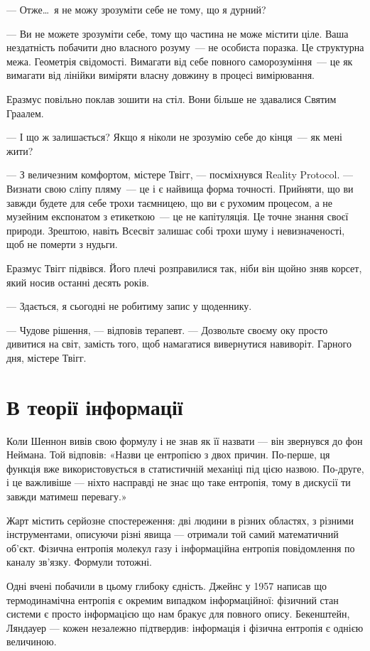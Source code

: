 \documentclass[12pt, a4paper, openany]{book}
\begin{document}
\begin{realitybox}
--- Отже\ldots\ я не можу зрозуміти себе не тому, що я дурний?

--- Ви не можете зрозуміти себе, тому що частина не може містити ціле. Ваша нездатність побачити дно власного розуму~--- не особиста поразка. Це структурна межа. Геометрія свідомості. Вимагати від себе повного саморозуміння~--- це як вимагати від лінійки виміряти власну довжину в процесі вимірювання.

\medskip
Еразмус повільно поклав зошити на стіл. Вони більше не здавалися Святим Граалем.

--- І що ж залишається? Якщо я ніколи не зрозумію себе до кінця~--- як мені жити?

--- З величезним комфортом, містере Твігг, --- посміхнувся Reality Protocol. --- Визнати свою сліпу пляму~--- це і є найвища форма точності. Прийняти, що ви завжди будете для себе трохи таємницею, що ви є рухомим процесом, а не музейним експонатом з етикеткою~--- це не капітуляція. Це точне знання своєї природи. Зрештою, навіть Всесвіт залишає собі трохи шуму і невизначеності, щоб не померти з нудьги.

\medskip
Еразмус Твігг підвівся. Його плечі розправилися так, ніби він щойно зняв корсет, який носив останні десять років.

--- Здається, я сьогодні не робитиму запис у щоденнику.

--- Чудове рішення, --- відповів терапевт. --- Дозвольте своєму оку просто дивитися на світ, замість того, щоб намагатися вивернутися навиворіт. Гарного дня, містере Твігг.
\end{realitybox}

\chapter{В теорії інформації}

Коли Шеннон вивів свою формулу і не знав як її назвати --- він звернувся до фон Неймана. Той відповів: «Назви це ентропією з двох причин. По-перше, ця функція вже використовується в статистичній механіці під цією назвою. По-друге, і це важливіше --- ніхто насправді не знає що таке ентропія, тому в дискусії ти завжди матимеш перевагу.»

Жарт містить серйозне спостереження: дві людини в різних областях, з різними інструментами, описуючи різні явища --- отримали той самий математичний об'єкт. Фізична ентропія молекул газу і інформаційна ентропія повідомлення по каналу зв'язку. Формули тотожні.

Одні вчені побачили в цьому глибоку єдність. Джейнс у 1957 написав що термодинамічна ентропія є окремим випадком інформаційної: фізичний стан системи є просто інформацією що нам бракує для повного опису. Бекенштейн, Ляндауер --- кожен незалежно підтвердив: інформація і фізична ентропія є однією величиною.
\end{document}
